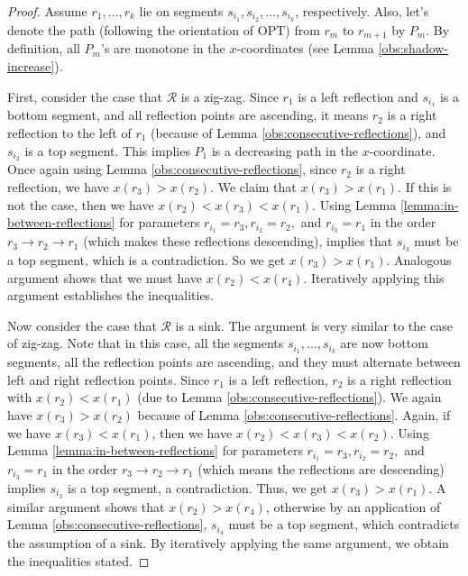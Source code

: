 \documentclass[10pt,a4paper]{amsart}
\theoremstyle{thmstyleone}
\newcommand{\OPT}{{\text{OPT}}}
\begin{document}
\begin{proof}
	Assume $r_1,\ldots,r_k$ lie on segments $s_{i_1},s_{i_2},
	\ldots,s_{i_k}$, respectively. Also, let's denote the path (following the orientation of $\OPT$) from $r_m$ to $r_{m+1}$ by $P_m$. By definition, all $P_m$'s are monotone in the $x$-coordinates (see Lemma \ref{obs:shadow-increase}).
	
	First, consider the case that $\mathcal R$ is a zig-zag.
	Since $r_1$ is a left reflection and $s_{i_1}$ is a bottom segment,
	and all reflection points are ascending, it means $r_2$ is a right reflection to the left of $r_1$ (because of Lemma \ref{obs:consecutive-reflections}), and $s_{i_2}$ is a top segment. This implies $P_1$ is a decreasing path in the $x$-coordinate. 
	Once again using Lemma \ref{obs:consecutive-reflections}, since $ r_2 $ is a right reflection, we have $x(r_3) > x(r_2)$.
	We claim that $x(r_3) > x(r_1)$. If this is not the case, then we have $x(r_2) < x(r_3) < x(r_1)$. 
	Using Lemma \ref{lemma:in-between-reflections} for parameters $r_{i_1} = r_3, r_{i_2} = r_2, $ and $r_{i_3} = r_1$ in the order $r_3 \to r_2 \to r_1$ (which makes these reflections descending), implies that $s_{i_3}$ must be a top segment, which is a contradiction. So we get $x(r_3) > x(r_1)$. 
	Analogous argument shows that we must have $x(r_2)<x(r_4)$. Iteratively applying this argument establishes the inequalities.
	        
	Now consider the case that $\mathcal R$ is a sink. The argument is very similar to the case of zig-zag. Note that in this case, all the segments $s_{i_1},\ldots,s_{i_k}$ are now bottom segments, all the reflection points are ascending, and they must alternate between left and right reflection points.
	Since $r_1$ is a left reflection, $r_2$ is a right reflection with $x(r_2)<x(r_1)$ (due to Lemma \ref{obs:consecutive-reflections}). 
	We again have $x(r_3) > x(r_2)$
	because of Lemma \ref{obs:consecutive-reflections}.
	Again, if we have $x(r_3) < x(r_1)$, then we have $x(r_2) < x(r_3) < x(r_2)$.
	Using Lemma \ref{lemma:in-between-reflections} for parameters $r_{i_1} = r_3, r_{i_2} = r_2,$ and $r_{i_3} = r_1$ in the order $r_3 \to r_2 \to r_1$ (which means the reflections are descending) implies $s_{i_3}$ is a top segment, a contradiction. Thus, we get $x(r_3) > x(r_1)$.
	A similar argument shows that $x(r_2)>x(r_4)$, otherwise by an application of Lemma \ref{obs:consecutive-reflections},  $s_{i_4}$ must be a top segment, which contradicts the assumption of a sink.
	By iteratively applying the same argument, we obtain the inequalities stated.
\end{proof}
\end{document}
